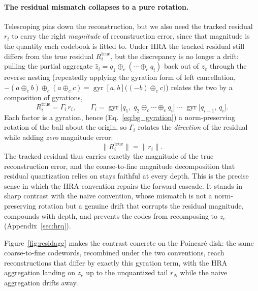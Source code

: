 \documentclass[12pt]{report}
\begin{document}
\paragraph{The residual mismatch collapses to a pure rotation.} Telescoping pins down the reconstruction, but we also need the tracked residual $r_i$ to carry the right \emph{magnitude} of reconstruction error, since that magnitude is the quantity each codebook is fitted to. Under HRA the tracked residual still differs from the true residual $R_i^{\text{true}}$, but the discrepancy is no longer a drift: pulling the partial aggregate $\hat z_i=q_1\oplus_c(\cdots\oplus_c q_i)$ back out of $z_e$ through the reverse nesting (repeatedly applying the gyration form of left cancellation, $-(a\oplus_c b)\oplus_c(a\oplus_c c)=\operatorname{gyr}[a,b]\big((-b)\oplus_c c\big)$) relates the two by a composition of gyrations,
\begin{equation}
    \label{eq:hrq_gyration}
    R_i^{\text{true}} = \Gamma_i\, r_i,
    \qquad
    \Gamma_i = \operatorname{gyr}\!\big[q_1,\;q_2\oplus_c\cdots\oplus_c q_i\big]\;\cdots\;\operatorname{gyr}\!\big[q_{i-1},\,q_i\big].
\end{equation}
Each factor is a gyration, hence (Eq.~\ref{eq:bg_gyration}) a norm-preserving rotation of the ball about the origin, so $\Gamma_i$ rotates the \emph{direction} of the residual while adding \emph{zero} magnitude error:
\begin{equation}
    \label{eq:hrq_norm}
    \big\|R_i^{\text{true}}\big\| = \big\|r_i\big\| .
\end{equation}
The tracked residual thus carries exactly the magnitude of the true reconstruction error, and the coarse-to-fine magnitude decomposition that residual quantization relies on stays faithful at every depth. This is the precise sense in which the HRA convention repairs the forward cascade. It stands in sharp contrast with the naive convention, whose mismatch is not a norm-preserving rotation but a genuine drift that corrupts the residual magnitude, compounds with depth, and prevents the codes from recomposing to $z_e$ (Appendix~\ref{sec:hrq}). 

Figure~\ref{fig:residagg} makes the contrast concrete on the Poincar\'e disk: the same coarse-to-fine codewords, recombined under the two conventions, reach reconstructions that differ by exactly this gyration term, with the HRA aggregation landing on $z_e$ up to the unquantized tail $r_{N}$ while the naive aggregation drifts away.
\end{document}
